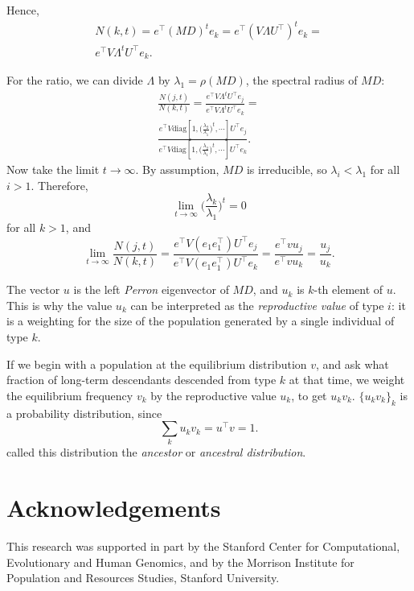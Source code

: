 \documentclass[9pt, a4paper, twocolumn]{extarticle}
\newcommand*{\tr}{^\intercal}
\newcommand{\matrx}[1]{{\left[ \stackrel{}{#1}\right]}}
\newcommand{\diag}[1]{\mbox{diag}\matrx{#1}}
\newcommand{\goesto}{\rightarrow}
\begin{document}
Hence,
\begin{multline}
N(k, t) = 
e\tr (MD)^t e_k =
e\tr  (V \Lambda U\tr)^t e_k = \\
e\tr V \Lambda^t U\tr e_k.
\end{multline}

For the ratio, we can divide $\Lambda$ by $\lambda_1 = \rho(MD)$,
the spectral radius of $MD$:
\begin{multline}
\frac{N(j,t)}{N(k,t)} =
\frac{ e\tr V \Lambda^t U\tr e_j}{ e\tr V \Lambda^t U\tr e_k} = \\
\frac{ e\tr V \diag{1, \Big(\frac{\lambda_2}{\lambda_1}\Big)^t, \cdots} U\tr e_j} { e\tr V \diag{1,\Big(\frac{\lambda_2}{\lambda_1}\Big)^t, \cdots} U\tr e_k}.
\end{multline}
Now take the limit $t \goesto \infty$.
By assumption, $MD$ is irreducible, so $\lambda_i < \lambda_1$ for all $i > 1$.
Therefore,
\begin{equation}
\lim_{t \goesto \infty} \Big( \frac{\lambda_k}{\lambda_1} \Big)^t = 0
\end{equation}
for all $k > 1$, and
\begin{equation}
\lim_{t \goesto \infty}\frac{N(j,t)}{N(k,t)} =
\frac{e\tr V (e_1 e_1\tr) U\tr e_j} { e\tr V (e_1 e_1\tr) U\tr e_k} = 
\frac{ e\tr v u_j} { e\tr v  u_k} =
\frac{u_j} {u_k}.
\end{equation}

The vector $u$ is the left \emph{Perron} eigenvector of $MD$, and $u_k$ is $k$-th element of $u$.
This is why the value $u_k$ can be interpreted as the \emph{reproductive value} of type $i$: it is a weighting for the size of the population generated by a single individual of type $k$.

If we begin with a population at the equilibrium distribution $v$,
and ask what fraction of long-term descendants descended from type $k$ at that time,
we weight the equilibrium frequency $v_k$ by the reproductive value $u_k$, to get $u_k v_k$.
$\{u_k v_k\}_{k}$ is a probability distribution, since
\begin{equation}
\sum_k {u_k v_k} = u\tr v = 1.
\end{equation}
\citet{Hermisson2002} called this distribution the \emph{ancestor} or \emph{ancestral distribution}.

{\small
\section*{Acknowledgements}

This research was supported in part by the Stanford Center for Computational, Evolutionary and Human Genomics, and by the Morrison Institute for Population and Resources Studies, Stanford University.
}


%

\end{document}
